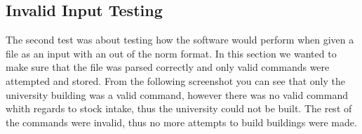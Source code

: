 \documentclass[12pt, A4]{report}
\begin{document}
			\begin{figure}[h]
				\centering	
				\qquad
			\end{figure}

		\subsection*{Invalid Input Testing}
		The second test was about testing how the software would perform when given a file as an input with an out of the norm format. In this section we wanted to make sure that the file was parsed correctly and only valid commands were attempted and stored. From the following screenshot you can see that only the university building was a valid command, however there was no valid command whith regards to stock intake, thus the university could not be built. The rest of the commands were invalid, thus no more attempts to build buildings were made.

			\begin{figure}[h]
				\centering	
				\qquad
			\end{figure}
\end{document}
